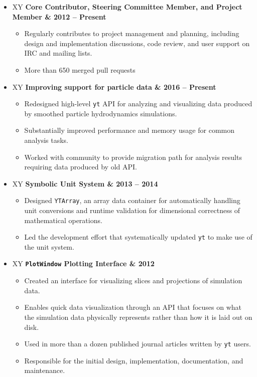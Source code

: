 \documentclass[10pt,letterpaper]{article}
\newcommand{\textline}[2]{
  \begin{tabularx}{\textwidth}{XY}
  #1 & #2
  \end{tabularx}
}
\begin{document}
\begin{itemize}

\item[] \textline{\bf Core Contributor, Steering Committee Member, and Project Member}{2012 -- Present}
  \begin{itemize}
    \item Regularly contributes to project management and planning, including
      design and implementation discussions, code review, and user support on
      IRC and mailing lists.
    \item More than 650 merged pull requests
  \end{itemize}

\item[] \textline{\bf Improving support for particle data}{2016 -- Present}
  \begin{itemize}
  \item Redesigned high-level \texttt{yt} API for analyzing and visualizing data
    produced by smoothed particle hydrodynamics simulations.
  \item Substantially improved performance and memory usage for common analysis
    tasks.
  \item Worked with community to provide migration path for analysis results
    requiring data produced by old API.\@
  \end{itemize}

\item[] \textline{\bf Symbolic Unit System}{2013 -- 2014}
  \begin{itemize}
    \item Designed \texttt{YTArray}, an array data container for automatically
      handling unit conversions and runtime validation for dimensional correctness
      of mathematical operations.
    \item Led the development effort that systematically updated \texttt{yt} to
      make use of the unit system.
  \end{itemize}

\item[] \textline{\bf \texttt{PlotWindow} Plotting Interface}{2012}
  \begin{itemize}
    \item Created an interface for visualizing slices and projections of
      simulation data.
    \item Enables quick data visualization through an API that focuses on what
      the simulation data physically represents rather than how it is laid out
      on disk.
    \item Used in more than a dozen published journal articles written by
      \texttt{yt} users.
    \item Responsible for the initial design, implementation, documentation, and maintenance.
  \end{itemize}

\end{itemize}
\end{document}
